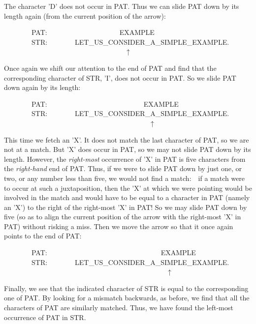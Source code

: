\documentclass[10pt]{book}
\newenvironment{pubasis}{\begin{flushleft}}{\end{flushleft}}
\begin{document}
The character 'D' does not occur in PAT.  Thus we can slide PAT down
by its length again (from the current position of the arrow):
\begin{pubasis}
~~~~~~~~PAT:~~~~~~~~~~~~~~~~~~~~~EXAMPLE\\
~~~~~~~~STR:~~~~~~~~LET\_US\_CONSIDER\_A\_SIMPLE\_EXAMPLE.\\
~~~~~~~~~~~~~~~~~~~~~~~~~~~~~~~~~~~$\uparrow$\\
\end{pubasis}
Once again we shift our attention to the end of PAT and find that
the corresponding character of STR, 'I', does not occur in PAT.
So we slide PAT down again by its length:
\begin{pubasis}
~~~~~~~~PAT:~~~~~~~~~~~~~~~~~~~~~~~~~~~~EXAMPLE\\
~~~~~~~~STR:~~~~~~~~LET\_US\_CONSIDER\_A\_SIMPLE\_EXAMPLE.\\
~~~~~~~~~~~~~~~~~~~~~~~~~~~~~~~~~~~~~~~~~~$\uparrow$\\
\end{pubasis}
This time we fetch an 'X'.  It does not match the last character
of PAT, so we are not at a match.  But 'X' does occur in PAT, so we
may not slide PAT down by its length.  However, the
\emph{right-most} occurrence of 'X' in PAT is five characters from the \emph{right-hand}
end of PAT.  Thus, if we were to slide PAT down by just one, or two, or any
number less than five, we would not find a match:~~if a match were to occur
at such a juxtaposition, then the 'X' at which we were pointing would be involved
in the match and would have to be equal to a character in PAT (namely an 'X') to the right
of the right-most 'X' in PAT!  So we may slide PAT down by five (so as
to align the current position of the arrow with
the right-most 'X' in PAT) without risking a miss.  Then we move the arrow 
so that it once again points to the end of PAT:
\begin{pubasis}
~~~~~~~~PAT:~~~~~~~~~~~~~~~~~~~~~~~~~~~~~~~~~EXAMPLE\\
~~~~~~~~STR:~~~~~~~~LET\_US\_CONSIDER\_A\_SIMPLE\_EXAMPLE.\\
~~~~~~~~~~~~~~~~~~~~~~~~~~~~~~~~~~~~~~~~~~~~~~~$\uparrow$\\
\end{pubasis}
Finally, we see that the indicated character of STR is equal to the corresponding
one of PAT.  By looking for a mismatch backwards, as before, we
find that all the characters of PAT are similarly matched.  Thus,
we have found the left-most occurrence of PAT in STR.
\end{document}

